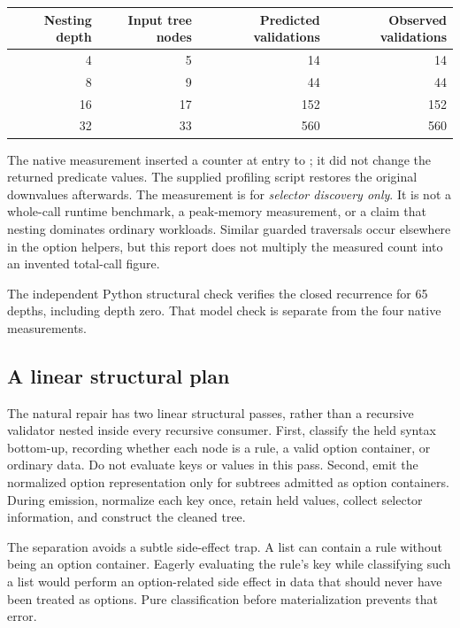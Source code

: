 \documentclass[11pt,letterpaper]{article}
\newcommand{\code}[1]{\texttt{\detokenize{#1}}}
\begin{document}
\begin{center}
\begin{tabular}{rrrr}
\toprule
Nesting depth & Input tree nodes & Predicted validations & Observed validations\\\midrule
4 & 5 & 14 & 14\\
8 & 9 & 44 & 44\\
16 & 17 & 152 & 152\\
32 & 33 & 560 & 560\\\bottomrule
\end{tabular}
\end{center}

The native measurement inserted a counter at entry to
\code{nativeOptionTreeQ}; it did not change the returned predicate values.
The supplied profiling script restores the original downvalues afterwards.
The measurement is for \emph{selector discovery only}. It is not a whole-call
runtime benchmark, a peak-memory measurement, or a claim that nesting dominates
ordinary workloads. Similar guarded traversals occur elsewhere in the option
helpers, but this report does not multiply the measured count into an invented
total-call figure.

The independent Python structural check verifies the closed recurrence for
65 depths, including depth zero. That model check is separate from the four
native measurements.

\subsection{A linear structural plan}

The natural repair has two linear structural passes, rather than a recursive
validator nested inside every recursive consumer. First, classify the held
syntax bottom-up, recording whether each node is a rule, a valid option
container, or ordinary data. Do not evaluate keys or values in this pass.
Second, emit the normalized option representation only for subtrees admitted
as option containers. During emission, normalize each key once, retain held
values, collect selector information, and construct the cleaned tree.

The separation avoids a subtle side-effect trap. A list can contain a rule
without being an option container. Eagerly evaluating the rule's key while
classifying such a list would perform an option-related side effect in data
that should never have been treated as options. Pure classification before
materialization prevents that error.
\end{document}
